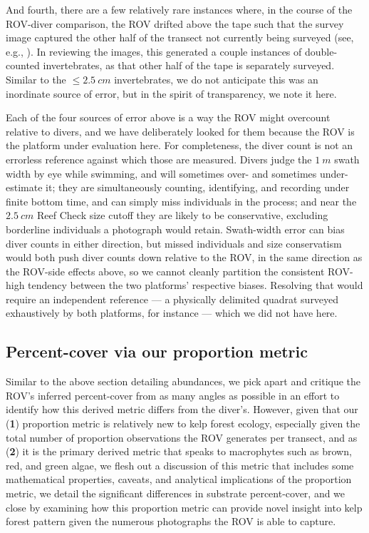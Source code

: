 \documentclass[11pt]{article}
\newcommand{\boxedref}[2]{%
	\begingroup
	\setlength{\fboxrule}{0.8pt}%
	\setlength{\fboxsep}{1.5pt}%
	\textcolor{linkcyan}{%
		\fbox{%
			\textcolor{black}{%
				\hyperref[#2]{#1~\ref*{#2}}%
			}%
		}%
	}%
	\endgroup
}
\newcommand{\figref}[1]{\boxedref{Fig.}{#1}}\newcommand{\tabref}[1]{\boxedref{Table}{#1}}
\begin{document}
And fourth, there are a few relatively rare instances where, in the course of 
the ROV-diver comparison, the ROV drifted above the tape such that the survey 
image captured the other half of the transect not currently being surveyed 
(see, e.g., \figref{fig:off_sides}). 
In reviewing the images, this generated a couple instances of double-counted
invertebrates, as that other half of the tape is separately surveyed.
Similar to the $\le 2.5~cm$ invertebrates, we do not anticipate this was an
inordinate source of error, but in the spirit of transparency, we note
it here.

Each of the four sources of error above is a way the ROV might overcount
relative to divers, and we have deliberately looked for them because the ROV
is the platform under evaluation here.
For completeness, the diver count is not an errorless reference against which
those are measured.
Divers judge the $1~m$ swath width by eye while swimming, and will
sometimes over- and sometimes under-estimate it; they are simultaneously
counting, identifying, and recording under finite bottom time, and can simply
miss individuals in the process; and near the $2.5~cm$ Reef Check size cutoff
they are likely to be conservative, excluding borderline individuals a
photograph would retain.
Swath-width error can bias diver counts in either direction, but missed
individuals and size conservatism would both push diver counts down relative
to the ROV, in the same direction as the ROV-side effects above, so we cannot
cleanly partition the consistent ROV-high tendency between the two platforms'
respective biases.
Resolving that would require an independent reference --- a physically
delimited quadrat surveyed exhaustively by both platforms, for instance ---
which we did not have here.


\subsection{Percent-cover via our proportion metric}

Similar to the above section detailing abundances, we pick apart and critique
the ROV's inferred percent-cover from as many angles as possible in an effort
to identify how this derived metric differs from the diver's.
However, given that our 
(\textbf{1}) 
proportion metric is relatively new to kelp forest ecology, especially given 
the total number of proportion observations the ROV generates per transect, and as
(\textbf{2}) 
it is the primary derived metric that speaks to macrophytes such as brown, red, 
and green algae, we flesh out a discussion of this metric that includes some 
mathematical properties, caveats, and analytical implications of the proportion 
metric, we detail the significant differences in substrate percent-cover, and 
we close by examining how this proportion metric can provide novel insight into 
kelp forest pattern given the numerous photographs the ROV is able to capture. 
\end{document}
